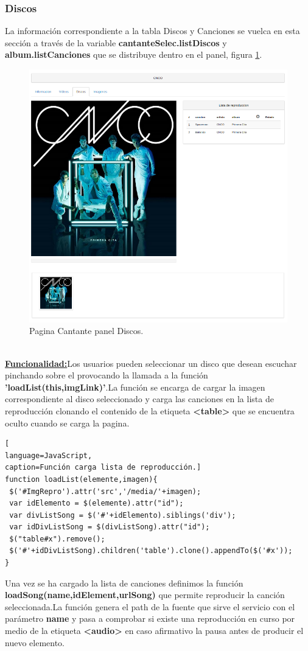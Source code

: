 \subsubsection*{Discos}
La información correspondiente a la tabla Discos y Canciones se vuelca en esta sección a través de la variable \textbf{cantanteSelec.listDiscos} y \textbf{album.listCanciones} que se distribuye dentro en el panel, figura \ref{fig:Discos_Cantante}.
\begin{figure}[!h]
\begin{center}
   \includegraphics[width=0.5\linewidth]{Figures/discos_Cantante}
	\decoRule
	\caption[Cantante panel Discos]{Pagina Cantante panel Discos.}
\label{fig:Discos_Cantante}
\end{center}
\end{figure}
\\\underline{\textbf{Funcionalidad:}}Los usuarios pueden seleccionar un disco que desean escuchar pinchando sobre el provocando la llamada a la función \textbf{'loadList(this,imgLink)'}.La función se encarga de cargar la imagen correspondiente al disco seleccionado y carga las canciones en la lista de reproducción clonando el contenido de la etiqueta \textbf{<table>} que se encuentra oculto cuando se carga la pagina.
\begin{lstlisting}[
language=JavaScript,
caption=Función carga lista de reproducción.]
function loadList(elemente,imagen){
 $('#ImgRepro').attr('src','/media/'+imagen);
 var idElemento = $(elemente).attr("id");
 var divListSong = $('#'+idElemento).siblings('div');
 var idDivListSong = $(divListSong).attr("id");
 $("table#x").remove();
 $('#'+idDivListSong).children('table').clone().appendTo($('#x'));
}
\end{lstlisting}
Una vez se ha cargado la lista de canciones definimos la función \textbf{loadSong(name,idElement,urlSong)} que permite reproducir la canción seleccionada.La función genera el path de la fuente que sirve el servicio con el parámetro \textbf{name} y pasa a comprobar si existe una reproducción en curso por medio de la etiqueta \textbf{<audio>} en caso afirmativo la pausa antes de producir el nuevo elemento.
